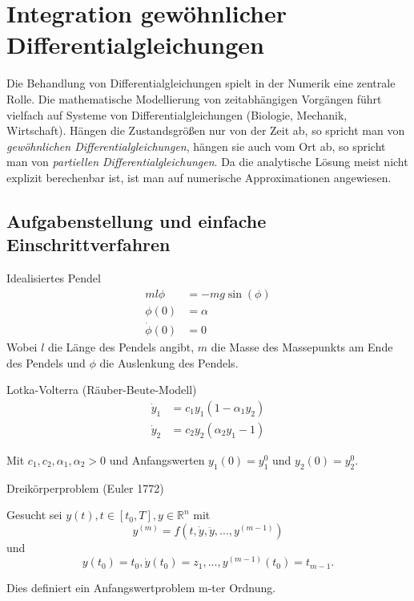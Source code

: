 \section{Integration gewöhnlicher Differentialgleichungen}

Die Behandlung von Differentialgleichungen spielt in der Numerik eine zentrale Rolle. Die mathematische Modellierung von zeitabhängigen Vorgängen führt vielfach auf Systeme von Differentialgleichungen (Biologie, Mechanik, Wirtschaft). Hängen die Zustandsgrößen nur von der Zeit ab, so spricht man von \emph{gewöhnlichen Differentialgleichungen}, hängen sie auch vom Ort ab, so spricht man von \emph{partiellen Differentialgleichungen}. Da die analytische Lösung meist nicht explizit berechenbar ist, ist man auf numerische Approximationen angewiesen.

\subsection{Aufgabenstellung und einfache Einschrittverfahren}

\begin{example} 
	Idealisiertes Pendel
	\begin{align}
		\nonumber m l \phi &= -m g \sin(\phi)\\
		\nonumber \phi(0) &= \alpha\\
		\nonumber \dot{\phi}(0) &= 0
	\end{align}
	Wobei $l$ die Länge des Pendels angibt, $m$ die Masse des Massepunkts am Ende des Pendels und $\phi$ die Auslenkung des Pendels.
\end{example}

\begin{example} 
	Lotka-Volterra (Räuber-Beute-Modell)
	\begin{align}
		\nonumber\dot{y}_1 &= c_1y_1(1-\alpha_1y_2)\\
		\nonumber\dot{y}_2 &= c_2y_2(\alpha_2y_1-1)
	\end{align}
		
	Mit $c_1, c_2, \alpha_1, \alpha_2 > 0$ und Anfangswerten $y_1(0) = y^0_1$ und $y_2(0) = y^0_2$.
\end{example}

\begin{example} 
	Dreikörperproblem (Euler 1772)
\end{example}

\begin{definition}[Definition IV.1]
	Gesucht sei 
	$y(t), t \in [t_0, T], y \in \mathbb{R}^n$ mit 
	$$y^{(m)} = f(t, \dot{y}, \ddot{y}, ..., y^{(m-1)})$$
	und
	$$y(t_0) = t_0, \dot{y}(t_0) = z_1, ..., y^{(m-1)}(t_0) = t_{m-1}.$$
	
	Dies definiert ein Anfangswertproblem m-ter Ordnung.
\end{definition}

